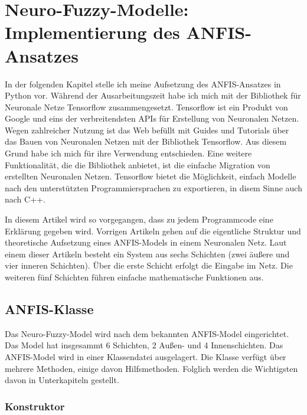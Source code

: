 \chapter{Neuro-Fuzzy-Modelle: Implementierung des ANFIS-Ansatzes}

In der folgenden Kapitel stelle ich meine Aufsetzung des ANFIS-Ansatzes in Python vor. Während der Ausarbeitungszeit habe ich mich mit der Bibliothek für Neuronale Netze Tensorflow zusammengesetzt. Tensorflow ist ein Produkt von Google und eins der verbreitendsten APIs für Erstellung von Neuronalen Netzen. Wegen zahlreicher Nutzung ist das Web befüllt mit Guides und Tutorials über das Bauen von Neuronalen Netzen mit der Bibliothek Tensorflow. Aus diesem Grund habe ich mich für ihre Verwendung entschieden. Eine weitere Funktionalität, die die Bibliothek anbietet, ist die einfache Migration von erstellten Neuronalen Netzen. Tensorflow bietet die Möglichkeit, einfach Modelle nach den unterstützten Programmiersprachen zu exportieren, in disem
Sinne auch nach C++.

In diesem Artikel wird so vorgegangen, dass zu jedem Programmcode eine Erklärung gegeben wird. Vorrigen Artikeln gehen auf die eigentliche Struktur und theoretische Aufsetzung eines ANFIS-Models in einem Neuronalen Netz. Laut einem dieser Artikeln besteht ein System aus sechs Schichten (zwei äußere und vier inneren Schichten). Über die erste Schicht erfolgt die Eingabe im Netz. Die weiteren fünf Schichten führen einfache mathematische Funktionen aus.

\section{ANFIS-Klasse}\label{anfis-klasse}

Das Neuro-Fuzzy-Model wird nach dem bekannten ANFIS-Model eingerichtet. Das Model hat insgesammt 6 Schichten, 2 Außen- und 4 Innenschichten. Das ANFIS-Model wird in einer Klassendatei ausgelagert. Die Klasse verfügt über mehrere Methoden, einige davon Hilfsmethoden. Folglich werden die Wichtigsten davon in Unterkapiteln gestellt.
\subsection{Konstruktor}\label{konstruktor}

